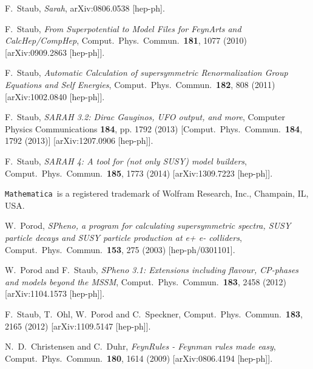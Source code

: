 \documentclass[12pt]{book}
\newcommand{\ttt}[1]{\texttt{#1}}
\newcommand{\Mathematica}{\ttt{Mathematica}}
\begin{document}
\begin{thebibliography}{19}
  F.~Staub,
  {\em Sarah},
  arXiv:0806.0538 [hep-ph].

  F.~Staub,
  {\em From Superpotential to Model Files for FeynArts and
    CalcHep/CompHep},
  Comput.\ Phys.\ Commun.\  {\bf 181}, 1077 (2010)
  [arXiv:0909.2863 [hep-ph]].

  F.~Staub,
  {\em Automatic Calculation of supersymmetric Renormalization Group
    Equations and Self Energies},
  Comput.\ Phys.\ Commun.\  {\bf 182}, 808 (2011)
  [arXiv:1002.0840 [hep-ph]].

  F.~Staub,
  {\em SARAH 3.2: Dirac Gauginos, UFO output, and more},
  Computer Physics Communications {\bf 184}, pp. 1792 (2013)
  [Comput.\ Phys.\ Commun.\  {\bf 184}, 1792 (2013)]
  [arXiv:1207.0906 [hep-ph]].

  F.~Staub,
  {\em SARAH 4: A tool for (not only SUSY) model builders},
  Comput.\ Phys.\ Commun.\  {\bf 185}, 1773 (2014)
  [arXiv:1309.7223 [hep-ph]].

  \Mathematica\ is a registered trademark of Wolfram Research, Inc.,
  Champain, IL, USA.

  W.~Porod,
  {\em SPheno, a program for calculating supersymmetric spectra, SUSY
    particle decays and SUSY particle production at e+ e- colliders},
  Comput.\ Phys.\ Commun.\  {\bf 153}, 275 (2003)
  [hep-ph/0301101].

  W.~Porod and F.~Staub,
  {\em SPheno 3.1: Extensions including flavour, CP-phases and models
    beyond the MSSM},
  Comput.\ Phys.\ Commun.\  {\bf 183}, 2458 (2012)
  [arXiv:1104.1573 [hep-ph]].

  F.~Staub, T.~Ohl, W.~Porod and C.~Speckner,
  Comput.\ Phys.\ Commun.\  {\bf 183}, 2165 (2012)
  [arXiv:1109.5147 [hep-ph]].


  N.~D.~Christensen and C.~Duhr,
  {\em FeynRules - Feynman rules made easy},
  Comput.\ Phys.\ Commun.\  {\bf 180}, 1614 (2009)
  [arXiv:0806.4194 [hep-ph]].


\end{thebibliography}
\end{document}

